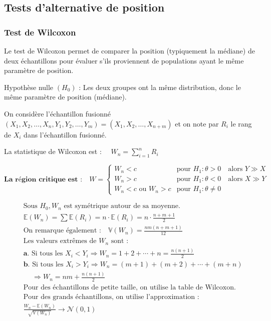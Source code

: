 \documentclass[
  12pt,
]{article}
\begin{document}
\subsection{Tests d'alternative de
position}\label{tests-dalternative-de-position}

\subsubsection{Test de Wilcoxon}\label{test-de-wilcoxon}

Le test de Wilcoxon permet de comparer la position (typiquement la
médiane) de deux échantillons pour évaluer s'ils proviennent de
populations ayant le même paramètre de position.

Hypothèse nulle \((H_0)\) : Les deux groupes ont la même distribution,
donc le même paramètre de position (médiane).

On considère l'échantillon fusionné
\((X_1, X_2, \dots, X_n, Y_1, Y_2, \dots, Y_m) = (X_1, X_2, \dots, X_{n+m})\)
et on note par \(R_i\) le rang de \(X_i\) dans l'échantillon fusionné.

La statistique de Wilcoxon est : \(\quad W_n = \sum_{i=1}^{n} R_i\)

\[
\textbf{La région critique est :} \quad
W =
\begin{cases}
W_n < c & \text{pour } H_1 : \theta > 0 \quad \text{alors } Y \gg X \\
W_n > c & \text{pour } H_1 : \theta < 0 \quad \text{alors } X \gg Y \\
W_n < c \text{ ou } W_n > c & \text{pour } H_1 : \theta \neq 0
\end{cases}
\]

\[
\begin{aligned}
&\text{Sous } H_0, W_n \text{ est symétrique autour de sa moyenne.} \\
&\mathbb{E}(W_n) = \sum \mathbb{E}(R_i) = n \cdot \mathbb{E}(R_i) = n \cdot \frac{n + m + 1}{2} \\[10pt]
&\text{On remarque également :} \quad \mathbb{V}(W_n) = \frac{nm(n + m + 1)}{12} \\[10pt]
&\text{Les valeurs extrêmes de } W_n \text{ sont :} \\
&\textbf{a. } \text{Si tous les } X_i < Y_i \Rightarrow W_n = 1 + 2 + \cdots + n = \frac{n(n + 1)}{2} \\
&\textbf{b. } \text{Si tous les } X_i > Y_i \Rightarrow W_n = (m + 1) + (m + 2) + \cdots + (m + n) \\
&\phantom{\textbf{b. }} \Rightarrow W_n = nm + \frac{n(n + 1)}{2} \\[10pt]
&\text{Pour des échantillons de petite taille, on utilise la table de Wilcoxon.} \\
&\text{Pour des grands échantillons, on utilise l’approximation :} \\
&\frac{W_n - \mathbb{E}(W_n)}{\sqrt{\mathbb{V}(W_n)}} \longrightarrow \mathcal{N}(0, 1)
\end{aligned}
\]
\end{document}

